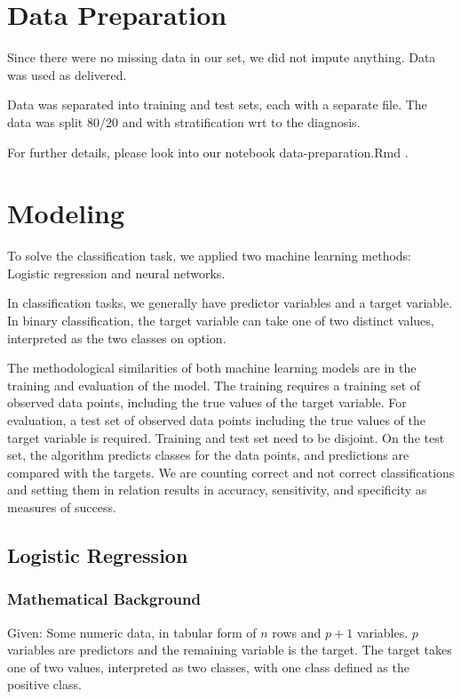 \documentclass[]{article}
\begin{document}
\section{Data Preparation}\label{data-preparation}

Since there were no missing data in our set, we did not impute anything.
Data was used as delivered.

Data was separated into training and test sets, each with a separate
file. The data was split 80/20 and with stratification wrt to the
diagnosis.

For further details, please look into our notebook data-preparation.Rmd
.

\section{Modeling}\label{modeling}

To solve the classification task, we applied two machine learning
methods: Logistic regression and neural networks.

In classification tasks, we generally have predictor variables and a
target variable. In binary classification, the target variable can take
one of two distinct values, interpreted as the two classes on option.

The methodological similarities of both machine learning models are in
the training and evaluation of the model. The training requires a
training set of observed data points, including the true values of the
target variable. For evaluation, a test set of observed data points
including the true values of the target variable is required. Training
and test set need to be disjoint. On the test set, the algorithm
predicts classes for the data points, and predictions are compared with
the targets. We are counting correct and not correct classifications and
setting them in relation results in accuracy, sensitivity, and
specificity as measures of success.

\subsection{Logistic Regression}\label{logistic-regression}

\subsubsection{Mathematical Background}\label{mathematical-background}

Given: Some numeric data, in tabular form of \(n\) rows and \(p+1\)
variables. \(p\) variables are predictors and the remaining variable is
the target. The target takes one of two values, interpreted as two
classes, with one class defined as the positive class.
\end{document}

